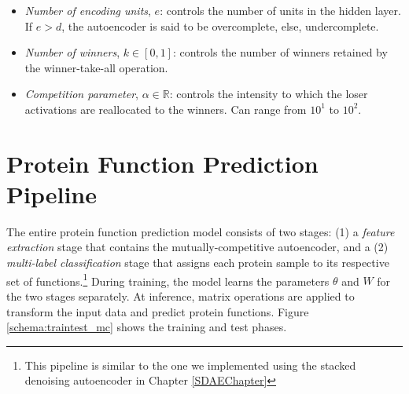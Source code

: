 \begin{itemize}
  \item \textit{Number of encoding units}, $e$: controls the number of units
  in the hidden layer. If $e > d$, the autoencoder is said to be
  overcomplete, else, undercomplete.
  \item \textit{Number of winners}, $k \in \left[0,1\right]$: controls the
  number of winners retained by the winner-take-all operation.
  \item \textit{Competition parameter}, $\alpha \in \mathbb{R}$: controls the
  intensity to which the loser activations are reallocated to the winners.
  Can range from $10^{1}$ to $10^{2}$.
\end{itemize}

\vspace*{-10pt}


\section{Protein Function Prediction Pipeline}
\label{PFPPipeline}

\par The entire protein function prediction model consists of two stages: (1)
a \textit{feature extraction} stage that contains the mutually-competitive
autoencoder, and a (2) \textit{multi-label classification} stage that assigns
each protein sample to its respective set of functions.\footnote{This
pipeline is similar to the one we implemented using the stacked denoising
autoencoder in Chapter \ref{SDAEChapter}} During training, the model learns
the parameters $\theta$ and $W$ for the two stages separately. At inference,
matrix operations are applied to transform the input data and predict protein
functions. Figure \ref{schema:traintest_mc} shows the training and test
phases.

